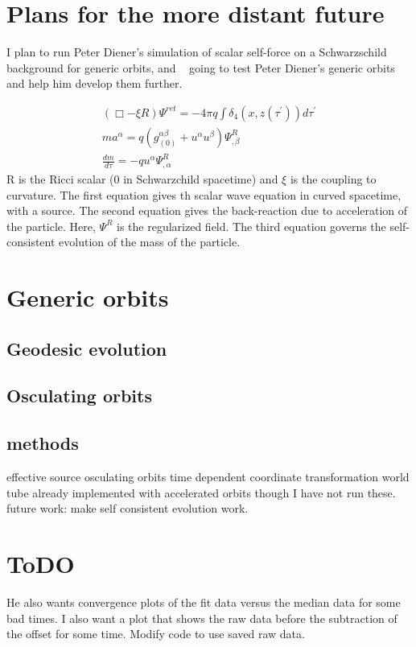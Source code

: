 \section{Plans for the more distant future}
I plan to run Peter Diener's simulation of scalar self-force on a Schwarzschild background for generic orbits, and ~\cite{fujita_cardoso}
going to test Peter Diener's generic orbits and help him develop them further.

\begin{eqnarray}
  (\Box - \xi R)\Psi^{ret} = -4\pi q \int\delta_4(x,z(\tau^\prime))d\tau^\prime\\
    ma^\alpha=q(g^{\alpha\beta}_{(0)}+u^\alpha u^\beta)\Psi^{R}_{,\beta}\\
    \frac{dm}{d\tau}=-q u^\alpha\Psi^R_{,\alpha}
\end{eqnarray}
R is the Ricci scalar (0 in Schwarzchild spacetime) and $\xi$ is the coupling to curvature. The first equation gives th scalar wave equation in curved spacetime, with a source. The second equation gives the back-reaction due to acceleration of the particle. Here, $\Psi^R$ is the regularized field. The third equation governs the self-consistent evolution of the mass of the particle.~\cite{WardellSelfForceReview}

\section{Generic orbits}
\subsection{Geodesic evolution}
\subsection{Osculating orbits}



\subsection{methods}
effective source
osculating orbits
time dependent coordinate transformation
world tube
already implemented with accelerated orbits though I have not run these.
future work: make self consistent evolution work. 



\section{ToDO}
He also wants convergence plots of the fit data versus the median data for some bad times. I also want a plot that shows the raw data before the subtraction of the offset for some time. Modify code to use saved raw data.


